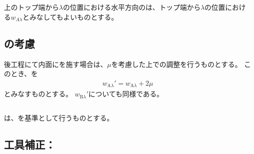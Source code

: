 \subsection{\HorizontalID}
\CenterCurvatureLine 上のトップ端から$\lambda$の位置における水平方向の\HorizontalID は、トップ端から$\lambda$の位置における\ACID$w_{A\lambda}$とみなしてもよいものとする。

\subsection{\PlatingThk の考慮}
後工程にて内面に\Plating を施す場合は、\PlatingThk$\mu$を考慮した上で\InnerDiameter の調整を行うものとする。
このとき、\ACID を
\begin{align*}
  w_{\mathrm A\lambda}' = w_{\mathrm A\lambda}+2\mu
\end{align*}
とみなすものとする。
\BDID$w_{\mathrm B\lambda}'$についても同様である。



\clearpage


\subsection{\EndFacecutMillingReferencePoint}
\EndFacecutMillingReferencePoint は、\EndFaceIDCenter を基準として行うものとする。


\subsection{工具補正：\nameEndFacecutMilling}

